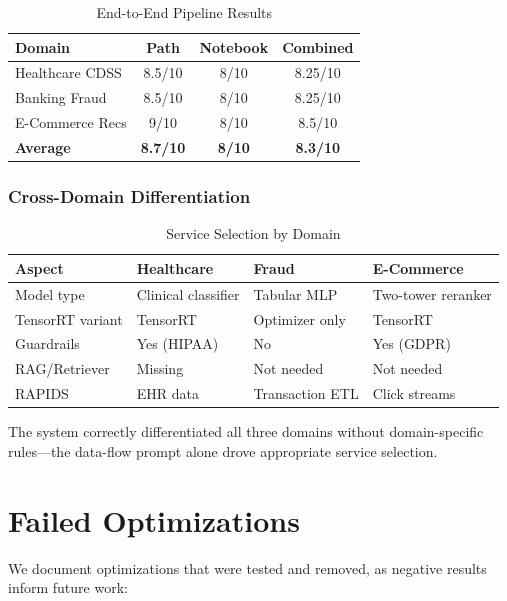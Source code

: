 \documentclass[conference]{IEEEtran}
\begin{document}
\begin{table}[h]
\centering
\caption{End-to-End Pipeline Results}
\label{tab:e2e}
\begin{tabular}{@{}lccc@{}}
\toprule
\textbf{Domain} & \textbf{Path} & \textbf{Notebook} & \textbf{Combined} \\
\midrule
Healthcare CDSS & 8.5/10 & 8/10 & 8.25/10 \\
Banking Fraud & 8.5/10 & 8/10 & 8.25/10 \\
E-Commerce Recs & 9/10 & 8/10 & 8.5/10 \\
\midrule
\textbf{Average} & \textbf{8.7/10} & \textbf{8/10} & \textbf{8.3/10} \\
\bottomrule
\end{tabular}
\end{table}

\subsubsection{Cross-Domain Differentiation}

\begin{table}[h]
\centering
\caption{Service Selection by Domain}
\label{tab:crossdomain}
\begin{tabular}{@{}L{2.2cm}L{1.8cm}L{1.8cm}L{1.8cm}@{}}
\toprule
\textbf{Aspect} & \textbf{Healthcare} & \textbf{Fraud} & \textbf{E-Commerce} \\
\midrule
Model type & Clinical classifier & Tabular MLP & Two-tower reranker \\
TensorRT variant & TensorRT & Optimizer only & TensorRT \\
Guardrails & Yes (HIPAA) & No & Yes (GDPR) \\
RAG/Retriever & Missing & Not needed & Not needed \\
RAPIDS & EHR data & Transaction ETL & Click streams \\
\bottomrule
\end{tabular}
\end{table}

The system correctly differentiated all three domains without domain-specific rules---the data-flow prompt alone drove appropriate service selection.

\section{Failed Optimizations}

We document optimizations that were tested and removed, as negative results inform future work:
\end{document}
